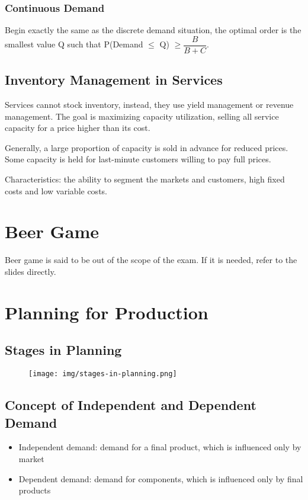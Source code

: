 \documentclass{article}
\begin{document}
\subsubsection{Continuous Demand}

Begin exactly the same as the discrete demand situation,
the optimal order is the smallest value Q such that P(Demand $\leq$ Q) $\geq \dfrac{B}{B+C}$.

\subsection{Inventory Management in Services}

Services cannot stock inventory, instead, they use yield management or revenue management.
The goal is maximizing capacity utilization, selling all service capacity for a price higher than its cost.

Generally, a large proportion of capacity is sold in advance for reduced prices.
Some capacity is held for last-minute customers willing to pay full prices.

Characteristics: the ability to segment the markets and customers, high fixed costs and low variable costs.

\section{Beer Game}

Beer game is said to be out of the scope of the exam. If it is needed, refer to the slides directly.

\section{Planning for Production}

\subsection{Stages in Planning}

\begin{figure}[]
	\centering
	\texttt{[image: img/stages-in-planning.png]}
\end{figure}

\subsection{Concept of Independent and Dependent Demand}

\begin{itemize}
	\item Independent demand: demand for a final product, which is influenced only by market
	\item Dependent demand: demand for components, which is influenced only by final products
\end{itemize}
\end{document}
